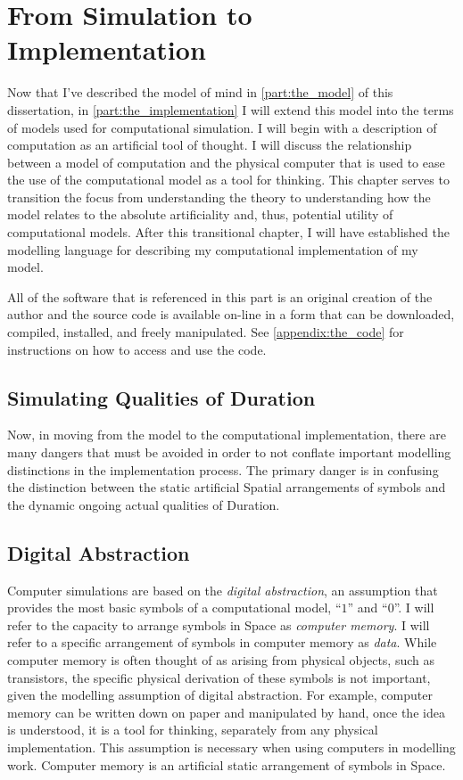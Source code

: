 \chapter{From Simulation to Implementation}
\label{chapter:from_simulation_to_implementation}

Now that I've described the model of mind in \autoref{part:the_model}
of this dissertation, in \autoref{part:the_implementation} I will
extend this model into the terms of models used for computational
simulation.  I will begin with a description of computation as an
artificial tool of thought.  I will discuss the relationship between a
model of computation and the physical computer that is used to ease
the use of the computational model as a tool for thinking.  This
chapter serves to transition the focus from understanding the theory
to understanding how the model relates to the absolute artificiality
and, thus, potential utility of computational models.  After this
transitional chapter, I will have established the modelling language
for describing my computational implementation of my model.

All of the software that is referenced in this part is an original
creation of the author and the source code is available on-line in a
form that can be downloaded, compiled, installed, and freely
manipulated.  See \autoref{appendix:the_code} for instructions on how
to access and use the code.

\section{Simulating Qualities of Duration}

Now, in moving from the model to the computational implementation,
there are many dangers that must be avoided in order to not conflate
important modelling distinctions in the implementation process.  The
primary danger is in confusing the distinction between the static
artificial Spatial arrangements of symbols and the dynamic ongoing
actual qualities of Duration.

\section{Digital Abstraction}

Computer simulations are based on the \emph{digital abstraction}, an
assumption that provides the most basic symbols of a computational
model, ``$1$'' and ``$0$''.  I will refer to the capacity to arrange
symbols in Space as \emph{computer memory}.  I will refer to a
specific arrangement of symbols in computer memory as \emph{data}.
While computer memory is often thought of as arising from physical
objects, such as transistors, the specific physical derivation of
these symbols is not important, given the modelling assumption of
digital abstraction.  For example, computer memory can be written down
on paper and manipulated by hand, once the idea is understood, it is a
tool for thinking, separately from any physical implementation.  This
assumption is necessary when using computers in modelling work.
Computer memory is an artificial static arrangement of symbols in
Space.

